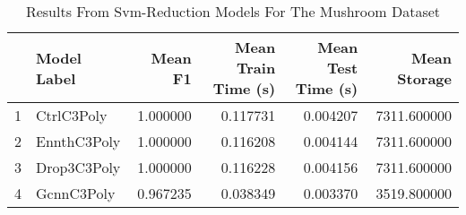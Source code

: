 \begin{table}
\centering
\caption{Results From Svm-Reduction Models For The Mushroom Dataset}
\label{tab:svm_reduction_results_mushroom}
\begin{tabular}{rlrrrr}
\toprule
 & Model Label & Mean F1 & Mean Train Time (s) & Mean Test Time (s) & Mean Storage \\
\midrule
1 & CtrlC3Poly & 1.000000 & 0.117731 & 0.004207 & 7311.600000 \\
2 & EnnthC3Poly & 1.000000 & 0.116208 & 0.004144 & 7311.600000 \\
3 & Drop3C3Poly & 1.000000 & 0.116228 & 0.004156 & 7311.600000 \\
4 & GcnnC3Poly & 0.967235 & 0.038349 & 0.003370 & 3519.800000 \\
\bottomrule
\end{tabular}
\end{table}

